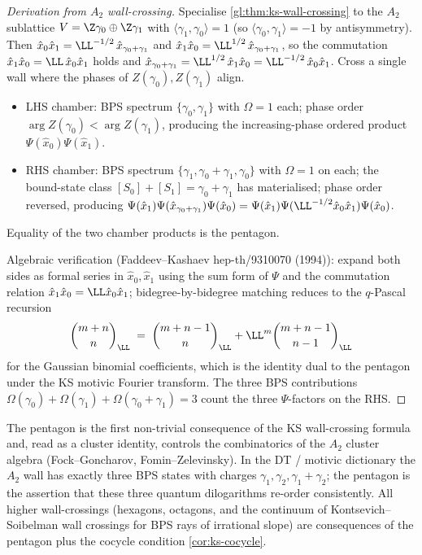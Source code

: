 \begin{proof}[Derivation from $A_2$ wall-crossing]
 Specialise \cref{gl:thm:ks-wall-crossing} to the $A_2$ sublattice
 $V = \Z \gamma_0 \oplus \Z \gamma_1$ with $\langle \gamma_1, \gamma_0
 \rangle = 1$ (so $\langle \gamma_0, \gamma_1 \rangle = -1$ by
 antisymmetry). Then $\hat x_0 \hat x_1 = \LL^{-1/2}\,
 \hat x_{\gamma_0 + \gamma_1}$ and $\hat x_1 \hat x_0 = \LL^{1/2}\,
 \hat x_{\gamma_0 + \gamma_1}$, so the commutation
 $\hat x_1 \hat x_0 = \LL\, \hat x_0 \hat x_1$ holds and
 $\hat x_{\gamma_0 + \gamma_1} = \LL^{1/2}\, \hat x_1 \hat x_0 =
 \LL^{-1/2}\, \hat x_0 \hat x_1$. Cross a single wall where the phases
 of $Z(\gamma_0), Z(\gamma_1)$ align.
 \begin{itemize}[leftmargin=2em]
 \item LHS chamber: BPS spectrum $\{\gamma_0, \gamma_1\}$ with
 $\Omega = 1$ each; phase order $\arg Z(\gamma_0) <
 \arg Z(\gamma_1)$, producing the increasing-phase ordered product
 $\Psi(\hat x_0) \Psi(\hat x_1)$.
 \item RHS chamber: BPS spectrum
 $\{\gamma_1, \gamma_0 + \gamma_1, \gamma_0\}$ with $\Omega = 1$ on
 each; the bound-state class $[S_0] + [S_1] = \gamma_0 + \gamma_1$
 has materialised; phase order reversed, producing
 $\Psi(\hat x_1) \Psi(\hat x_{\gamma_0 + \gamma_1}) \Psi(\hat x_0)
 = \Psi(\hat x_1) \Psi(\LL^{-1/2} \hat x_0 \hat x_1) \Psi(\hat x_0)$.
 \end{itemize}
 Equality of the two chamber products is the pentagon.

 Algebraic verification (Faddeev--Kashaev hep-th/9310070 (1994)):
 expand both sides as formal series in $\hat x_0, \hat x_1$ using the
 sum form of $\Psi$ and the commutation relation $\hat x_1 \hat x_0 =
 \LL \hat x_0 \hat x_1$; bidegree-by-bidegree matching reduces to the
 $q$-Pascal recursion
 \[
 \binom{m+n}{n}_\LL \;=\; \binom{m+n-1}{n}_\LL + \LL^{m}
 \binom{m+n-1}{n-1}_\LL
 \]
 for the Gaussian binomial coefficients, which is the identity dual to
 the pentagon under the KS motivic Fourier transform. The three BPS
 contributions $\Omega(\gamma_0) + \Omega(\gamma_1) + \Omega(\gamma_0 +
 \gamma_1) = 3$ count the three $\Psi$-factors on the RHS.
\end{proof}

\begin{remark}
 \label{rem:pentagon-bps-conservation}
 The pentagon is the first non-trivial consequence of the KS
 wall-crossing formula and, read as a cluster identity, controls the
 combinatorics of the $A_2$ cluster algebra (Fock--Goncharov,
 Fomin--Zelevinsky). In the DT / motivic dictionary the $A_2$ wall has
 exactly three BPS states with charges $\gamma_1, \gamma_2, \gamma_1 + \gamma_2$;
 the pentagon is the assertion that these three quantum dilogarithms
 re-order consistently. All higher wall-crossings (hexagons, octagons,
 and the continuum of Kontsevich--Soibelman wall crossings for BPS
 rays of irrational slope) are consequences of the pentagon plus the
 cocycle condition \cref{cor:ks-cocycle}.
\end{remark}

